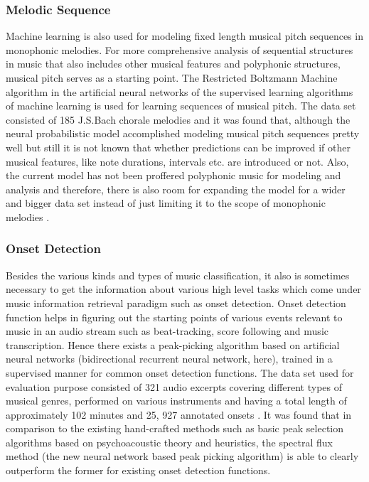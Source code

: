 \documentclass{proc}
\begin{document}
\subsubsection{Melodic Sequence}
Machine learning is also used for modeling fixed length musical pitch sequences in monophonic melodies. For more comprehensive analysis of sequential structures in music that also includes other musical features and polyphonic structures, musical pitch serves as a starting point. The Restricted Boltzmann Machine algorithm in the artificial neural networks of the supervised learning algorithms of machine learning is used for learning sequences of musical pitch. The data set consisted of 185 J.S.Bach chorale melodies and it was found that, although the neural probabilistic model accomplished modeling musical pitch sequences pretty well but still it is not known that whether predictions can be improved if other musical features, like note durations, intervals etc. are introduced or not. Also, the current model has not been proffered polyphonic music for modeling and analysis and therefore, there is also room for expanding the model for a wider and bigger data set instead of just limiting it to the scope of monophonic melodies \cite{Cherla2013}.
\subsubsection{Onset Detection}
Besides the various kinds and types of music classification, it also is sometimes necessary to get the information about various high level tasks which come under music information retrieval paradigm such as onset detection. Onset detection function helps in figuring out the starting points of various events relevant to music in an audio stream such as beat-tracking, score following and music transcription. Hence there exists a peak-picking algorithm based on artificial neural networks (bidirectional recurrent neural network, here), trained in a supervised manner for common onset detection functions. The data set used for evaluation purpose consisted of 321 audio excerpts covering different types of musical genres, performed on various instruments and having a total length of approximately 102 minutes and 25, 927 annotated onsets \cite{Sebastian2013}. It was found that in comparison to the existing hand-crafted methods such as basic peak selection algorithms based on psychoacoustic theory and heuristics, the spectral flux method (the new neural network based peak picking algorithm) is able to clearly outperform the former for existing onset detection functions.
\end{document}
